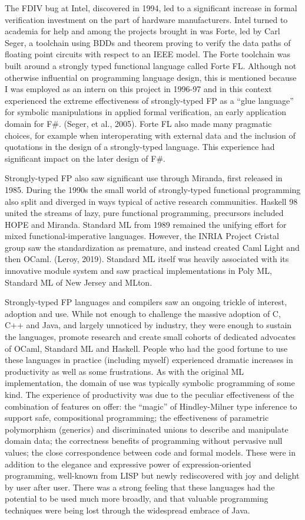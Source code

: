 \documentclass[acmsmall,review]{acmart}\settopmatter{printfolios=true,printccs=false,printacmref=false}
\begin{document}
The FDIV bug at Intel, discovered in 1994,  led to a significant increase in formal verification investment on the part of hardware manufacturers. Intel turned to academia for help and among the projects brought in was Forte, led by Carl Seger, a toolchain using BDDs and theorem proving to verify the data paths of floating point circuits with respect to an IEEE model.  The Forte toolchain was built around a strongly typed functional language called Forte FL. Although not otherwise influential on programming language design, this is mentioned because I was employed as an intern on this project in 1996-97 and in this context experienced the extreme effectiveness of strongly-typed FP as a “glue language” for symbolic manipulations in applied formal verification, an early application domain for F\#. (Seger, et al., 2005). Forte FL also made many pragmatic choices, for example when interoperating with external data and the inclusion of quotations in the design of a strongly-typed language. This experience had significant impact on the later design of F\#.

Strongly-typed FP also saw significant use through Miranda, first released in 1985.  During the 1990s the small world of strongly-typed functional programming also split and diverged in ways typical of active research communities.  Haskell 98 united the streams of lazy, pure functional programming, precursors included HOPE and Miranda.  Standard ML from 1989 remained the unifying effort for mixed functional-imperative languages. However, the INRIA Project Cristal group saw the standardization as premature, and instead created Caml Light and then OCaml. (Leroy, 2019). Standard ML itself was heavily associated with its innovative module system and saw practical implementations in Poly ML, Standard ML of New Jersey and MLton.

Strongly-typed FP languages and compilers saw an ongoing trickle of interest, adoption and use. While not enough to challenge the massive adoption of C, C++ and Java, and largely unnoticed by industry, they were enough to sustain the languages, promote research and create small cohorts of dedicated advocates of OCaml, Standard ML and Haskell.   People who had the good fortune to use these languages in practice (including myself) experienced dramatic increases in productivity as well as some frustrations. As with the original ML implementation, the domain of use was typically symbolic programming of some kind. The experience of productivity was due to the peculiar effectiveness of the combination of features on offer: the “magic” of Hindley-Milner type inference to support safe, compositional programming; the effectiveness of parametric polymorphism (generics) and discriminated unions to describe and manipulate domain data; the correctness benefits of programming without pervasive null values; the close correspondence between code and formal models. These were in addition to the elegance and expressive power of expression-oriented programming, well-known from LISP but newly rediscovered with joy and delight by user after user. There was a strong feeling that these languages had the potential to be used much more broadly, and that valuable programming techniques were being lost through the widespread embrace of Java.  
\end{document}
